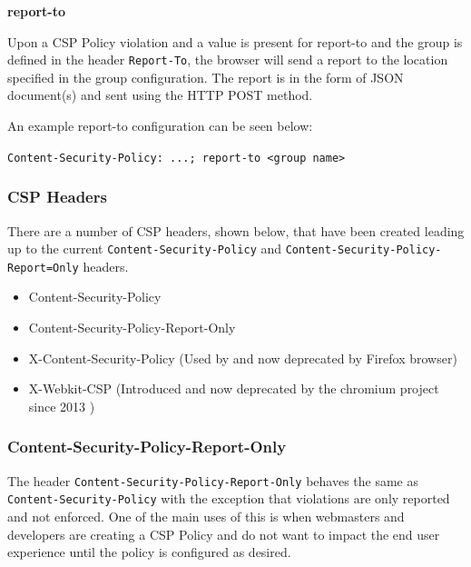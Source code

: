 \documentclass{mscreport}
\begin{document}
\vspace{0.7cm} \noindent
\textbf{report-to}

\vspace{0.3cm} \noindent
Upon a CSP Policy violation and a value is present for report-to and the group is defined in the header \texttt{Report-To}, the browser will send a report to the location specified in the group configuration. The report is in the form of JSON document(s) and sent using the HTTP POST method.

\vspace{0.3cm} \noindent
An example report-to configuration can be seen below:

\vspace{0.3cm} \noindent
\texttt{Content-Security-Policy: ...; report-to <group name>}

\subsubsection{CSP Headers}

There are a number of CSP headers, shown below, that have been created leading up to the current \texttt{Content-Security-Policy} and \texttt{Content-Security-Policy-Report=Only} headers.

\begin{itemize}
	\setlength\itemsep{0.1em}
	\item Content-Security-Policy
	\item Content-Security-Policy-Report-Only
	\item X-Content-Security-Policy (Used by and now deprecated by Firefox browser)
	\item X-Webkit-CSP (Introduced and now deprecated by the chromium project since 2013 \cite{Google_undated-ct})
\end{itemize}


\subsubsection{Content-Security-Policy-Report-Only}

The header \texttt{Content-Security-Policy-Report-Only} behaves the same as \newline \texttt{Content-Security-Policy} with the exception that violations are only reported and not enforced. One of the main uses of this is when webmasters and developers are creating a CSP Policy and do not want to impact the end user experience until the policy is configured as desired.
\end{document}
